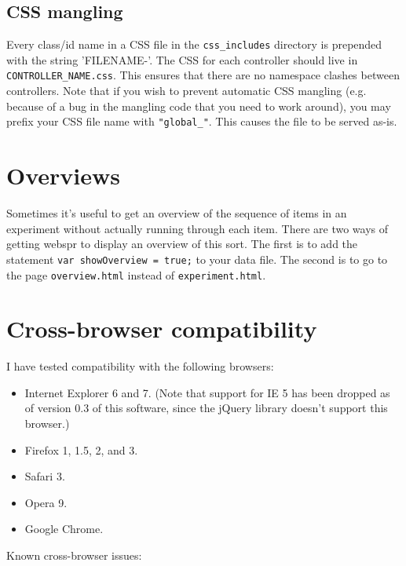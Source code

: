 \documentclass[
]{article}
\providecommand{\tightlist}{%
  \setlength{\itemsep}{0pt}\setlength{\parskip}{0pt}}
\begin{document}
\hypertarget{css-mangling}{%
\subsection{CSS mangling}\label{css-mangling}}

Every class/id name in a CSS file in the \texttt{css\_includes}
directory is prepended with the string 'FILENAME-'. The CSS for each
controller should live in \texttt{CONTROLLER\_NAME.css}. This ensures
that there are no namespace clashes between controllers. Note that if
you wish to prevent automatic CSS mangling (e.g. because of a bug in the
mangling code that you need to work around), you may prefix your CSS
file name with \texttt{"global\_"}. This causes the file to be served
as-is.

\hypertarget{overviews}{%
\section{Overviews}\label{overviews}}

Sometimes it's useful to get an overview of the sequence of items in an
experiment without actually running through each item. There are two
ways of getting webspr to display an overview of this sort. The first is
to add the statement \texttt{var\ showOverview\ =\ true;} to your data
file. The second is to go to the page \texttt{overview.html} instead of
\texttt{experiment.html}.

\hypertarget{cross-browser-compatibility}{%
\section{Cross-browser
compatibility}\label{cross-browser-compatibility}}

I have tested compatibility with the following browsers:

\begin{itemize}
\tightlist
\item
  Internet Explorer 6 and 7. (Note that support for IE 5 has been
  dropped as of version 0.3 of this software, since the jQuery library
  doesn't support this browser.)
\item
  Firefox 1, 1.5, 2, and 3.
\item
  Safari 3.
\item
  Opera 9.
\item
  Google Chrome.
\end{itemize}

Known cross-browser issues:
\end{document}
